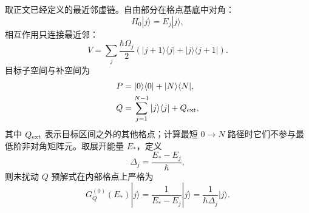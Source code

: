 \begin{derivation}
取正文已经定义的最近邻虚链。自由部分在格点基底中对角：
\begin{equation*}
 H_0|j\rangle=E_j|j\rangle,
\end{equation*}
相互作用只连接最近邻：
\begin{equation*}
 V
 =\sum_j\frac{\hbar\Omega_j}{2}
 \left(|j+1\rangle\langle j|+|j\rangle\langle j+1|\right).
\end{equation*}
目标子空间与补空间为
\begin{align*}
 P&=|0\rangle\langle0|+|N\rangle\langle N|,\\
 Q&=\sum_{j=1}^{N-1}|j\rangle\langle j|+Q_{\rm ext},
\end{align*}
其中 $Q_{\rm ext}$ 表示目标区间之外的其他格点；计算最短 $0\to N$ 路径时它们不参与最低阶非对角矩阵元。取展开能量 $E_*$，定义
\begin{equation*}
 \Delta_j=\frac{E_*-E_j}{\hbar},
\end{equation*}
则未扰动 $Q$ 预解式在内部格点上严格为
\begin{equation*}
 G_Q^{(0)}(E_*)|j\rangle
 =\frac1{E_*-E_j}|j\rangle
 =\frac1{\hbar\Delta_j}|j\rangle.
\end{equation*}


\end{derivation}
